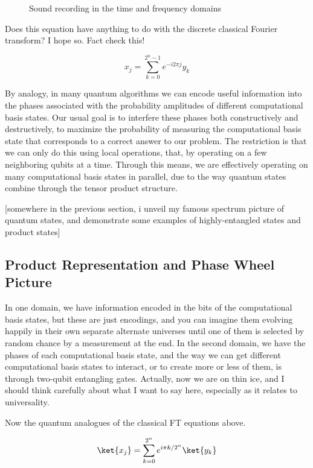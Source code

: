 \begin{figure}
\caption{Sound recording in the time and frequency domains}
\end{figure}

Does this equation have anything to do with the discrete classical Fourier
transform? I hope so. Fact check this!

\begin{equation}
x_j = \sum_{k=0}^{2^n-1} e^{-i2\pi j}y_k
\end{equation}

By analogy, in many quantum algorithms we can encode useful information
into the phases associated with the probability amplitudes of different
computational basis states. Our usual goal is to interfere these phases
both constructively and destructively, to maximize the probability of measuring
the computational basis state that corresponds to a correct answer to our
problem. The restriction is that we can only do this using local operations,
that, by operating on a few neighboring qubits at a time. Through this means,
we are effectively operating on many computational basis states in parallel,
due to the way quantum states combine through the tensor product structure.

[somewhere in the previous section, i unveil my famous spectrum picture
of quantum states, and demonstrate some examples of highly-entangled
states and product states]

\subsection{Product Representation and Phase Wheel Picture}

In one domain, we have information encoded in the bits of the computational
basis states, but these are just encodings, and you can imagine them
evolving happily in their own separate alternate universes until one of them
is selected by random chance by a measurement at the end.
In the second domain, we have the phases of each computational basis state,
and the way we can get different computational basis states to interact, or
to create more or less of them, is through two-qubit entangling gates.
Actually, now we are on thin ice, and I should think carefully about what I
want to say here, especially as it relates to universality.

Now the quantum analogues of the classical FT equations above.

\begin{equation}
\ket{x_j} = \sum_{k=0}^{2^n} e^{i\pi k / 2^n}\ket{y_k}
\end{equation}

